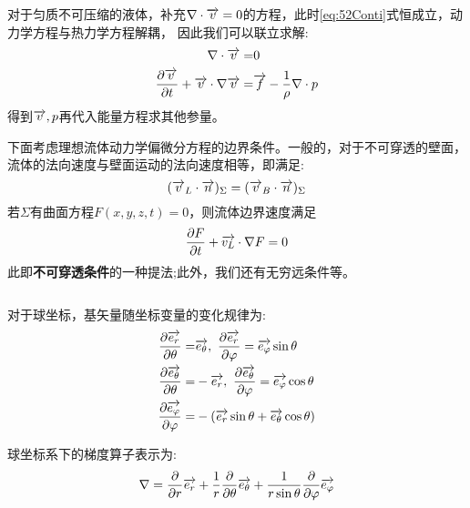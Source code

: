 对于匀质不可压缩的液体，补充$\nabla \cdot \overrightarrow{v}=0$的方程，此时\eqref{eq:52Conti}式恒成立，动力学方程与热力学方程解耦，
因此我们可以联立求解:
\begin{align}\notag
\nabla \cdot \overrightarrow{v}=&0\\
 \frac{\partial \overrightarrow{v}}{\partial t}+\overrightarrow{v}\cdot\nabla\overrightarrow{v} =&\overrightarrow{f}-\frac{1}{\rho}\nabla\cdot p
\end{align}
得到$\overrightarrow{v},p$再代入能量方程求其他参量。

下面考虑理想流体动力学偏微分方程的边界条件。一般的，对于不可穿透的壁面，流体的法向速度与壁面运动的法向速度相等，即满足:
\begin{equation}
(\overrightarrow{v}_L\cdot \overrightarrow{n})_{\Sigma}=(\overrightarrow{v}_B\cdot \overrightarrow{n})_{\Sigma}
\end{equation}
若$\Sigma$有曲面方程$F(x,y,z,t)=0$，则流体边界速度满足
\begin{equation}
\frac{\partial F}{\partial t} + \overrightarrow{v_L} \cdot \nabla F=0
\end{equation}
此即\textbf{不可穿透条件}的一种提法;此外，我们还有无穷远条件等。

\begin{equation}
\end{equation}

对于球坐标，基矢量随坐标变量的变化规律为\cite{Del}:
\begin{align}
\frac{\partial \overrightarrow{e_r}}{\partial \theta}=&\overrightarrow{e_{\theta}},\,\,  \frac{\partial \overrightarrow{e_r}}{\partial \varphi}=\overrightarrow{e_{\varphi}}\sin\theta\\
\frac{\partial \overrightarrow{e_{\theta}}}{\partial \theta}=&-\overrightarrow{e_r},\,\,  \frac{\partial \overrightarrow{e_{\theta}}}{\partial \varphi}=\overrightarrow{e_{\varphi}}\cos\theta\\
\frac{\partial \overrightarrow{e_{\varphi}}}{\partial \varphi}=&-(\overrightarrow{e_r}\sin\theta+\overrightarrow{e_{\theta}}\cos\theta)
\end{align}

球坐标系下的梯度算子表示为:
\begin{equation}
\nabla = \frac{\partial }{\partial r} \overrightarrow{e_r} + \frac{1}{r} \frac{\partial}{\partial \theta} \overrightarrow{e_{\theta}}+
\frac{1}{r\sin\theta}
\frac{\partial }{\partial \varphi}\overrightarrow{e_{\varphi}}
\end{equation}

